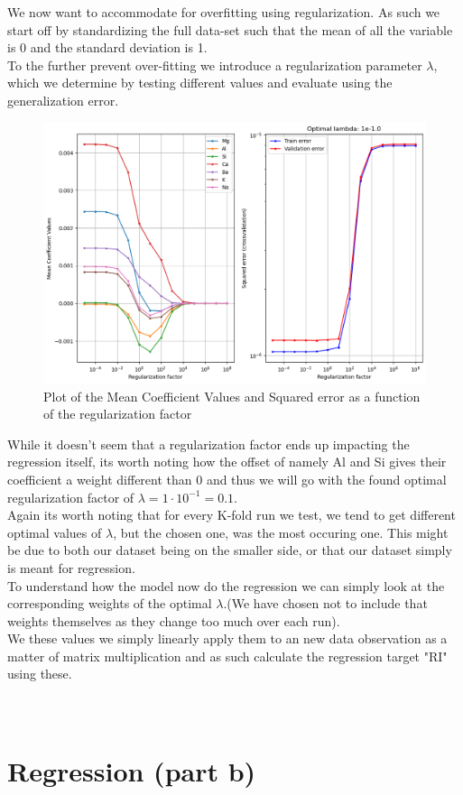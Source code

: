 We now want to accommodate for overfitting using regularization. As such we start off by standardizing the full data-set such that the mean of all the variable is 0 and the standard deviation is 1. \color[red]{It is worth noting that the helper function "rlr_validate" also standardizes its internal data partitions as a part of kfold cross-validation when it selects values of $\lambda$} \\
To the further prevent over-fitting we introduce a regularization parameter $\lambda$, which we determine by testing different values and evaluate using the generalization error.
\begin{figure}[H]
    \centering
    \includegraphics[width=15cm]{images/regularization.png}
    \caption{Plot of the Mean Coefficient Values and Squared error as a function of the regularization factor}
    \label{fig:regu_plot}
\end{figure}
While it doesn't seem that a regularization factor ends up impacting the regression itself, its worth noting how the offset of namely Al and Si gives their coefficient a weight different than 0 and thus we will go with the found optimal regularization factor of $\lambda = 1\cdot 10^{-1} = 0.1$. \\
Again its worth noting that for every K-fold run we test, we tend to get different optimal values of $\lambda$, but the chosen one, was the most occuring one. This might be due to both our dataset being on the smaller side, or that our dataset simply is meant for regression.\\

To understand how the model now do the regression we can simply look at the corresponding weights of the optimal $\lambda$.(We have chosen not to include that weights themselves as they change too much over each run).\\We these values we simply linearly apply them to an new data observation as a matter of matrix multiplication and as such calculate the regression target "RI" using these.\\
\\
\\


\section{Regression (part b)}
